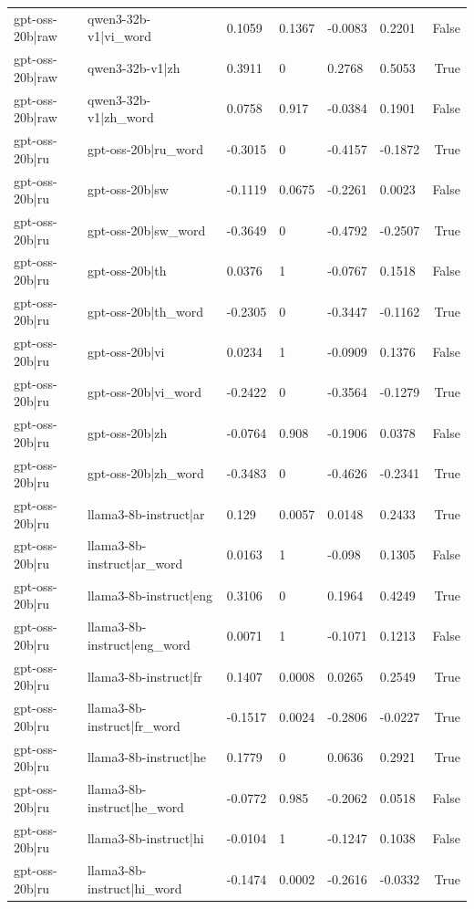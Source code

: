 \begin{table}
\begin{tabular}{llllllr}
gpt-oss-20b|raw & qwen3-32b-v1|vi_word & 0.1059 & 0.1367 & -0.0083 & 0.2201 & False \\
gpt-oss-20b|raw & qwen3-32b-v1|zh & 0.3911 & 0 & 0.2768 & 0.5053 & True \\
gpt-oss-20b|raw & qwen3-32b-v1|zh_word & 0.0758 & 0.917 & -0.0384 & 0.1901 & False \\
gpt-oss-20b|ru & gpt-oss-20b|ru_word & -0.3015 & 0 & -0.4157 & -0.1872 & True \\
gpt-oss-20b|ru & gpt-oss-20b|sw & -0.1119 & 0.0675 & -0.2261 & 0.0023 & False \\
gpt-oss-20b|ru & gpt-oss-20b|sw_word & -0.3649 & 0 & -0.4792 & -0.2507 & True \\
gpt-oss-20b|ru & gpt-oss-20b|th & 0.0376 & 1 & -0.0767 & 0.1518 & False \\
gpt-oss-20b|ru & gpt-oss-20b|th_word & -0.2305 & 0 & -0.3447 & -0.1162 & True \\
gpt-oss-20b|ru & gpt-oss-20b|vi & 0.0234 & 1 & -0.0909 & 0.1376 & False \\
gpt-oss-20b|ru & gpt-oss-20b|vi_word & -0.2422 & 0 & -0.3564 & -0.1279 & True \\
gpt-oss-20b|ru & gpt-oss-20b|zh & -0.0764 & 0.908 & -0.1906 & 0.0378 & False \\
gpt-oss-20b|ru & gpt-oss-20b|zh_word & -0.3483 & 0 & -0.4626 & -0.2341 & True \\
gpt-oss-20b|ru & llama3-8b-instruct|ar & 0.129 & 0.0057 & 0.0148 & 0.2433 & True \\
gpt-oss-20b|ru & llama3-8b-instruct|ar_word & 0.0163 & 1 & -0.098 & 0.1305 & False \\
gpt-oss-20b|ru & llama3-8b-instruct|eng & 0.3106 & 0 & 0.1964 & 0.4249 & True \\
gpt-oss-20b|ru & llama3-8b-instruct|eng_word & 0.0071 & 1 & -0.1071 & 0.1213 & False \\
gpt-oss-20b|ru & llama3-8b-instruct|fr & 0.1407 & 0.0008 & 0.0265 & 0.2549 & True \\
gpt-oss-20b|ru & llama3-8b-instruct|fr_word & -0.1517 & 0.0024 & -0.2806 & -0.0227 & True \\
gpt-oss-20b|ru & llama3-8b-instruct|he & 0.1779 & 0 & 0.0636 & 0.2921 & True \\
gpt-oss-20b|ru & llama3-8b-instruct|he_word & -0.0772 & 0.985 & -0.2062 & 0.0518 & False \\
gpt-oss-20b|ru & llama3-8b-instruct|hi & -0.0104 & 1 & -0.1247 & 0.1038 & False \\
gpt-oss-20b|ru & llama3-8b-instruct|hi_word & -0.1474 & 0.0002 & -0.2616 & -0.0332 & True \\

\end{tabular}
\end{table}
